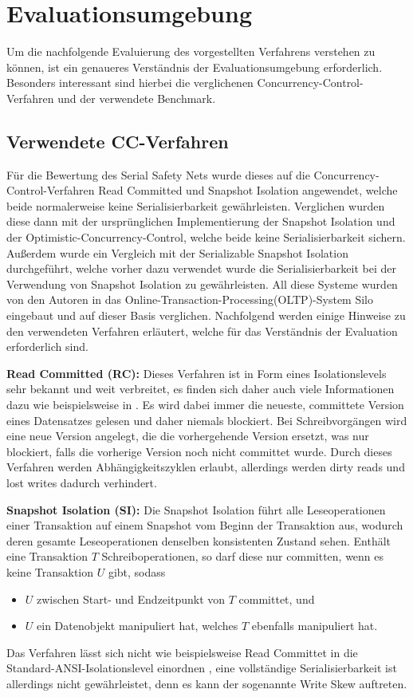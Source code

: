 \section{Evaluationsumgebung}
\label{sec:evaluation_umgebung}

Um die nachfolgende Evaluierung des vorgestellten Verfahrens verstehen zu können, ist ein genaueres Verständnis der Evaluationsumgebung erforderlich.
Besonders interessant sind hierbei die verglichenen Concurrency-Control-Verfahren und der verwendete Benchmark.

\subsection{Verwendete CC-Verfahren}
Für die Bewertung des Serial Safety Nets wurde dieses auf die Concurrency-Control-Verfahren Read Committed und Snapshot Isolation angewendet, welche beide normalerweise keine Serialisierbarkeit gewährleisten.
Verglichen wurden diese dann mit der ursprünglichen Implementierung der Snapshot Isolation und der Optimistic-Concurrency-Control, welche beide keine Serialisierbarkeit sichern.
Außerdem wurde ein Vergleich mit der Serializable Snapshot Isolation durchgeführt, welche vorher dazu verwendet wurde die Serialisierbarkeit bei der Verwendung von Snapshot Isolation zu gewährleisten.
All diese Systeme wurden von den Autoren in das Online-Transaction-Processing(OLTP)-System Silo eingebaut und auf dieser Basis verglichen.
Nachfolgend werden einige Hinweise zu den verwendeten Verfahren erläutert, welche für das Verständnis der Evaluation erforderlich sind.

\textbf{Read Committed (RC):} Dieses Verfahren ist in Form eines Isolationslevels sehr bekannt und weit verbreitet, es finden sich daher auch viele Informationen dazu wie beispielsweise in \cite{Berenson:1995}.
Es wird dabei immer die neueste, committete Version eines Datensatzes gelesen und daher niemals blockiert.
Bei Schreibvorgängen wird eine neue Version angelegt, die die vorhergehende Version ersetzt, was nur blockiert, falls die vorherige Version noch nicht committet wurde.
Durch dieses Verfahren werden Abhängigkeitszyklen erlaubt, allerdings werden dirty reads und lost writes \cite{Berenson:1995} dadurch verhindert.

\textbf{Snapshot Isolation (SI):} Die Snapshot Isolation führt alle Leseoperationen einer Transaktion auf einem Snapshot vom Beginn der Transaktion aus, wodurch deren gesamte Leseoperationen denselben konsistenten Zustand sehen.
Enthält eine Transaktion $T$ Schreiboperationen, so darf diese nur committen, wenn es keine Transaktion $U$ gibt, sodass 
\begin{itemize}
	\item $U$ zwischen Start- und Endzeitpunkt von $T$ committet, und
	\item $U$ ein Datenobjekt manipuliert hat, welches $T$ ebenfalls manipuliert hat.
\end{itemize}
Das Verfahren lässt sich nicht wie beispielsweise Read Committet in die Standard-ANSI-Isolationslevel einordnen \cite{Adya:2000}, eine vollständige Serialisierbarkeit ist allerdings nicht gewährleistet, denn es kann der sogenannte Write Skew auftreten.

